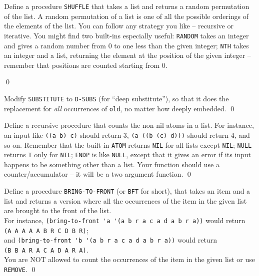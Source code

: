 \documentclass[a4paper,11pt]{article}
\begin{document}
\begin{uexercise}
Define a procedure \Verb+SHUFFLE+ that takes a list and returns a random permutation of the list. A random permutation of a list is one of all the possible orderings of the elements of the list. You can follow any strategy you like -- recursive or iterative.
You might find two built-ins especially useful: \Verb+RANDOM+ takes an integer and gives a random number from 0 to one less than the given integer; \Verb+NTH+ takes an integer and a list, returning the element at the position of the given integer -- remember that positions are counted starting from 0.

\qed
\end{uexercise}

\begin{uexercise}

Modify \Verb+SUBSTITUTE+ to \Verb+D-SUBS+ (for ``deep substitute''), so that it does the replacement for \emph{all} occurrences of \Verb+old+, no matter how deeply embedded.
\qed
\end{uexercise}

\begin{uexercise}

Define a recursive procedure that counts the non-nil atoms  in a list. For instance, an input like \Verb+((a b) c)+ should return 3, \Verb+(a ((b (c) d)))+ should return 4, and so on. Remember that the  built-in \Verb+ATOM+ returns \Verb+NIL+ for all lists except \Verb+NIL+; \Verb+NULL+ returns \Verb+T+ only for \Verb+NIL+; \Verb+ENDP+ is like \Verb+NULL+, except that it gives an error if its input happens to be something other than a list. Your function should use a counter/accumulator -- it will be a two argument function.
\qed
\end{uexercise}

\begin{uexercise}
Define a procedure \Verb+BRING-TO-FRONT+ (or \Verb+BFT+ for short), that takes an item and a list and returns a version where all the occurrences of the item in the given list are brought to the front of the list.\\ For instance, 
\Verb+(bring-to-front 'a '(a b r a c a d a b r a))+ would return\\ \Verb+(A A A A A B R C D B R)+;\\ and \Verb+(bring-to-front 'b '(a b r a c a d a b r a))+ would return \\ \Verb+(B B A R A C A D A R A)+.\\ You are NOT allowed to count the occurrences of the item in the given list or use \Verb+REMOVE+.
\qed
\end{uexercise}
\end{document}
